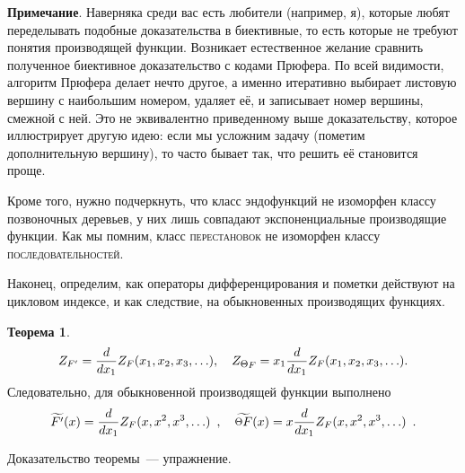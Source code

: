 \documentclass{article}
\def \point {\raisebox{.1\height}{\scalebox{0.8}{$\Theta$}}}
\theoremstyle{definition}
\newtheorem*{theorem}{Теорема}
\begin{document}
{\footnotesize
\textbf{Примечание}. Наверняка среди вас есть любители (например, я), которые
любят переделывать подобные доказательства в биективные, то есть которые не
требуют понятия производящей функции. Возникает естественное желание сравнить
полученное биективное доказательство с кодами Прюфера. По всей видимости,
алгоритм Прюфера делает нечто другое, а именно итеративно выбирает листовую вершину с
наибольшим номером, удаляет её, и записывает номер вершины, смежной с ней. Это
не эквивалентно приведенному выше доказательству, которое иллюстрирует другую
идею: если мы усложним задачу (пометим дополнительную вершину), то часто бывает
так, что решить её становится проще.

Кроме того, нужно подчеркнуть, что класс эндофункций не изоморфен классу
позвоночных деревьев, у них лишь совпадают экспоненциальные производящие
функции. Как мы помним, класс
\textsc{перестановок} не изоморфен классу \textsc{последовательностей}.}

Наконец, определим, как операторы дифференцирования и пометки действуют на
цикловом индексе, и как следствие, на обыкновенных производящих функциях.
\begin{theorem}
\[
    Z_{F'} = \dfrac{d}{dx_1} Z_F(x_1, x_2, x_3, \ldots), \quad
    Z_{\point F} = x_1 \dfrac{d}{d x_1} Z_F(x_1, x_2, x_3, \ldots). 
\]
Следовательно, для обыкновенной производящей функции выполнено
\[
    \widetilde{F'}(x) = \dfrac{d}{dx_1} Z_F(x, x^2, x^3, \ldots)\enspace ,
\quad
    \widetilde{\point F}(x) = x \dfrac{d}{dx_1} Z_F(x, x^2, x^3, \ldots)
\enspace .
\]
\end{theorem}
Доказательство теоремы~--- упражнение.
\end{document}
